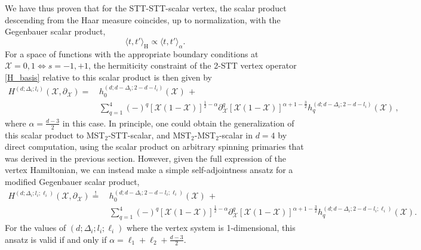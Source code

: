 \documentclass{article}
\def \Dg {\Delta}
\def \ds {\partial}
\def \ag {\alpha}
\begin{document}
We have thus proven that for the STT-STT-scalar vertex, the scalar product descending from the Haar measure coincides, up to normalization, with the Gegenbauer scalar product,
\begin{equation}
    \langle t, t'\rangle_{\mathrm{H}} \propto \langle t,t'\rangle_{\ag}. 
\end{equation}
For a space of functions with the appropriate boundary conditions at $\mathcal{X}=0,1 \iff s = -1,+1$, the hermiticity constraint of the 2-STT vertex operator \eqref{H_basis} relative to this scalar product is then given by
\begin{align}
H^{(d;\Dg_i;l_i)}(\mathcal{X},\ds_{\mathcal{X}}) =\,& h_0^{(d;d-\Dg_i;2-d-l_i)}(\mathcal{X})\, + \nonumber \\
&\sum_{q=1}^4 (-)^q [\mathcal{X}(1-\mathcal{X})]^{\frac{1}{2}-\alpha}\ds_{\mathcal{X}}^q [\mathcal{X}(1-\mathcal{X})]^{\alpha+1-\frac{3}{2}} h_q^{(d;d-\Dg_i;2-d-l_i)}(\mathcal{X})\,, 
\end{align}
where $\ag = \frac{d-3}{2}$ in this case. In principle, one could obtain the generalization of this scalar product to  MST$_2$-STT-scalar, and  MST$_2$-MST$_2$-scalar in $d=4$ by direct computation, using the scalar product on arbitrary spinning primaries that was derived in the previous section. However, given the full expression of the vertex Hamiltonian, we can instead make a simple self-adjointness ansatz for a modified Gegenbauer scalar product,
\begin{align}
H^{(d;\Dg_i;l_i;\ell_i)}(\mathcal{X},\ds_{\mathcal{X}}) \stackrel{!}{=}\,& h_0^{(d;d-\Dg_i;2-d-l_i;\ell_i)}(\mathcal{X})\, + \nonumber \\
&\sum_{q=1}^4 (-)^q [\mathcal{X}(1-\mathcal{X})]^{\frac{1}{2}-\alpha}\ds_{\mathcal{X}}^q [\mathcal{X}(1-\mathcal{X})]^{\alpha+1-\frac{3}{2}} h_q^{(d;d-\Dg_i;2-d-l_i;\ell_i)}(\mathcal{X}).
\end{align}
For the values of $(d;\Dg_i;l_i;\ell_i)$ where the vertex system is 1-dimensional, this ansatz is valid if and only if $\ag = \ell_1+\ell_2 + \frac{d-3}{2}$. 
\end{document}
